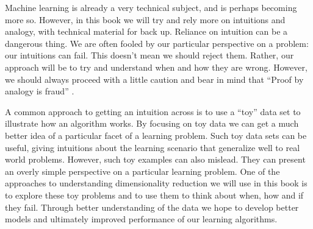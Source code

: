 Machine learning is already a very technical subject, and is perhaps
becoming more so. However, in this book we will try and rely more on
intuitions and analogy, with technical material for back up. Reliance
on intuition can be a dangerous thing. We are often fooled by our
particular perspective on a problem: our intuitions can fail. This
doesn't mean we should reject them. Rather, our approach will be to
try and understand when and how they are wrong. However, we should
always proceed with a little caution and bear in mind that ``Proof by
analogy is fraud'' \cite[][page 692]{Stroustrup:tc++pl00}.

A common approach to getting an intuition across is to use a ``toy''
data set to illustrate how an algorithm works. By focusing on toy
data we can get a much better idea of a particular facet of a learning
problem. Such toy data sets can be useful, giving intuitions about
the learning scenario that generalize well to real world problems.
However, such toy examples can also mislead. They can present an overly
simple perspective on a particular learning problem. One of the approaches
to understanding dimensionality reduction we will use in this book
is to explore these toy problems and to use them to think about when,
how and if they fail. Through better understanding of the data we
hope to develop better models and ultimately improved performance
of our learning algorithms.

